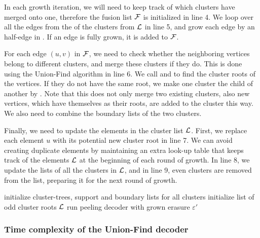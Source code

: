 In each growth iteration, we will need to keep track of which clusters have merged onto one, therefore the fusion list $\mathcal{F}$ is initialized in line 4. We loop over all the edges from the  of the clusters from $\mathcal{L}$ in line 5, and grow each edge by an half-edge in . If an edge is fully grown, it is added to $\mathcal{F}$.

For each edge $(u,v)$ in $\mathcal{F}$, we need to check whether the neighboring vertices belong to different clusters, and merge these clusters if they do. This is done using the Union-Find algorithm in line 6. We call  and  to find the cluster roots of the vertices. If they do not have the same root, we make one cluster the child of another by . Note that this does not only merge two existing clusters, also new vertices, which have themselves as their roots, are added to the cluster this way. We also need to combine the boundary lists of the two clusters.

Finally, we need to update the elements in the cluster list $\mathcal{L}$. First, we replace each element $u$ with its potential new cluster root  in line 7. We can avoid creating duplicate elements by maintaining an extra look-up table that keeps track of the elements $\mathcal{L}$ at the beginning of each round of growth. In line 8, we update the  lists of all the clusters in $\mathcal{L}$, and in line 9, even clusters are removed from the list, preparing it for the next round of growth.

\begin{algo}[algotitle=Union-Find decoder \cite{delfosse2017almost}, label=algo:uf]
\begin{algorithm}[H]
    \BlankLine
    initialize cluster-trees, support and boundary lists for all clusters \;
    initialize list of odd cluster roots $\mathcal{L}$\;
    run peeling decoder with grown erasure $\varepsilon'$
\end{algorithm}
\end{algo}

\subsubsection{Time complexity of the Union-Find decoder}
